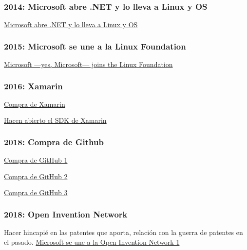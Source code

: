 \subsubsection{2014: Microsoft abre .NET y lo lleva a Linux y OS}
\href{https://arstechnica.com/information-technology/2014/11/microsoft-open-sources-net-takes-it-to-linux-and-os-x/}{Microsoft abre .NET y lo lleva a Linux y OS}

\subsubsection{2015: Microsoft se une a la Linux Foundation}
 \href{hhttps://arstechnica.com/information-technology/2016/11/microsoft-yes-microsoft-joins-the-linux-foundation/}{Microsoft ---yes, Microsoft--- joins the Linux Foundation}

\subsubsection{2016: Xamarin}
\href{https://www.genbeta.com/desarrollo/microsoft-adquiere-xamarin}{Compra de Xamarin}

\href{https://www.petri.com/microsofts-newly-acquired-xamarin-expands-developer-tools-new-features}{Hacen abierto el SDK de Xamarin}

\subsubsection{2018: Compra de Github}
\href{https://www.xataka.com/aplicaciones/oficial-microsoft-compra-github-7-500-millones-dolares}{Compra de GitHub 1}

\href{https://www.elconfidencial.com/tecnologia/2018-06-04/microsoft-ahora-ama-el-software-libre-compra-la-startup-github-por-7-500-millones_1573704/}{Compra de GitHub 2}

\href{https://www.xataka.com/aplicaciones/microsoft-punto-adquirir-github-desarrolladores-desarrolladores-desarrolladores}{Compra de GitHub 3}

\subsubsection{2018: Open Invention Network}
Hacer hincapié en las patentes que aporta, relación con la guerra de patentes en el pasado.
\href{https://azure.microsoft.com/en-us/blog/microsoft-joins-open-invention-network-to-help-protect-linux-and-open-source/}{Microsoft se une a la Open Invention Network 1}

